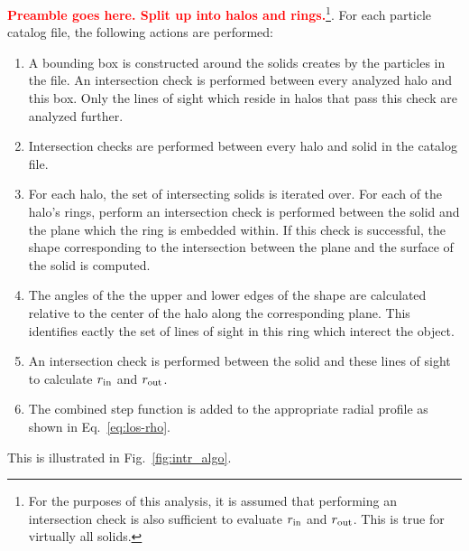 \documentclass[numberedappendix,apj]{emulateapj}
\begin{document}
\textcolor{red}{\textbf{Preamble goes here. Split up into halos and
rings.}}\footnote{For the purposes of this analysis, it is assumed
that performing an intersection check is also sufficient to evaluate
$r_{\rm in}$ and $r_{\rm out}$. This is true for virtually all solids.}.
For each particle catalog file, the following actions are performed:
\begin{enumerate}
        \item[1.] A bounding box is constructed around the solids creates by
        the particles in the file. An intersection check is performed between
        every analyzed halo and this box. Only the lines of sight which reside
        in halos that pass this check are analyzed further.
        \item[2.] Intersection checks are performed between every halo and
        solid in the catalog file.
        \item[3.] For each halo, the set of intersecting solids is iterated
        over. For each of the halo's rings, perform an intersection check is
        performed between the solid and the plane which the ring is embedded
        within. If this check is successful, the shape corresponding to the 
        intersection between the plane and the surface of the solid is computed.
        \item[4.] The angles of the the upper and lower edges of the shape
        are calculated relative to the center of the halo along the
        corresponding plane. This identifies eactly the set of lines of sight
        in this ring which interect the object.
        \item[5.] An intersection check is performed between the solid and these
        lines of sight to calculate $r_{\rm in}$ and $r_{\rm out}$.
        \item[6.] The combined step function is added to the appropriate radial
        profile as shown in Eq.~\ref{eq:los-rho}.
\end{enumerate}

This is illustrated in Fig.~\ref{fig:intr_algo}.
\end{document}
